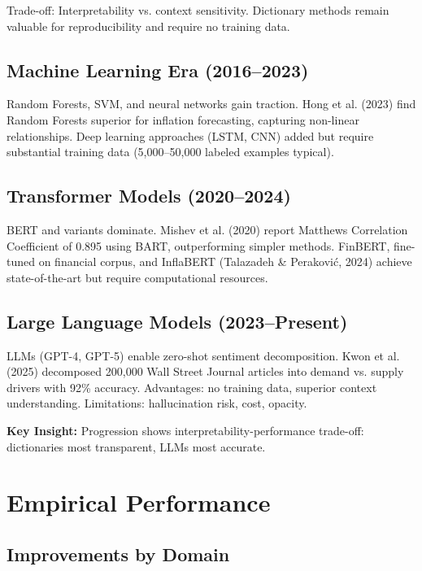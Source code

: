 \documentclass[11pt]{article}
\begin{document}
Trade-off: Interpretability vs. context sensitivity. Dictionary methods remain valuable for reproducibility and require no training data.

\subsection{Machine Learning Era (2016--2023)}

Random Forests, SVM, and neural networks gain traction. Hong et al. (2023) find Random Forests superior for inflation forecasting, capturing non-linear relationships. Deep learning approaches (LSTM, CNN) added but require substantial training data (5,000--50,000 labeled examples typical).

\subsection{Transformer Models (2020--2024)}

BERT and variants dominate. Mishev et al. (2020) report Matthews Correlation Coefficient of 0.895 using BART, outperforming simpler methods. FinBERT, fine-tuned on financial corpus, and InflaBERT (Talazadeh \& Peraković, 2024) achieve state-of-the-art but require computational resources.

\subsection{Large Language Models (2023--Present)}

LLMs (GPT-4, GPT-5) enable zero-shot sentiment decomposition. Kwon et al. (2025) decomposed 200,000 Wall Street Journal articles into demand vs. supply drivers with 92\% accuracy. Advantages: no training data, superior context understanding. Limitations: hallucination risk, cost, opacity.

\textbf{Key Insight:} Progression shows interpretability-performance trade-off: dictionaries most transparent, LLMs most accurate.

\section{Empirical Performance}

\subsection{Improvements by Domain}
\end{document}
